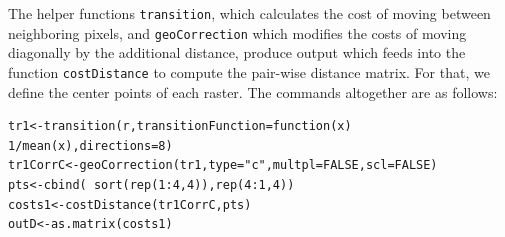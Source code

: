 \documentclass[12pt]{article}
\begin{document}
The helper functions \mbox{\tt transition}, which
calculates the cost of moving between neighboring pixels, and
\mbox{\tt geoCorrection} which modifies the costs of moving diagonally
by the additional distance, produce output which feeds into the
function \mbox{\tt costDistance} to compute the pair-wise distance
matrix. For that, we define the center points of each raster.  The
commands altogether are as follows:

\begin{verbatim}
tr1<-transition(r,transitionFunction=function(x) 1/mean(x),directions=8)
tr1CorrC<-geoCorrection(tr1,type="c",multpl=FALSE,scl=FALSE)
pts<-cbind( sort(rep(1:4,4)),rep(4:1,4))
costs1<-costDistance(tr1CorrC,pts)
outD<-as.matrix(costs1)
\end{verbatim}
\end{document}
